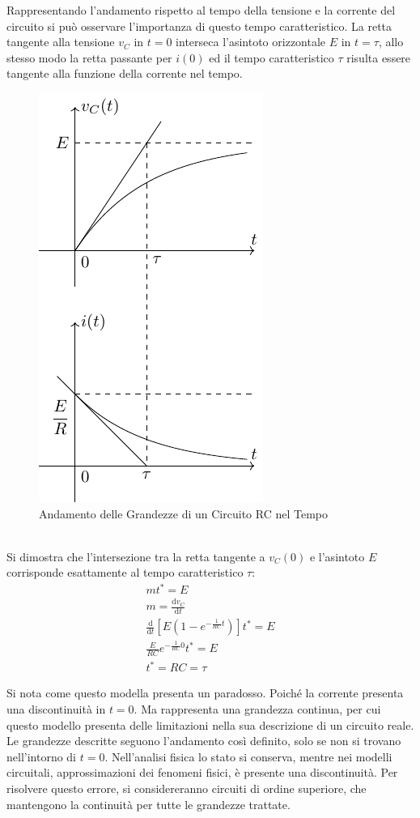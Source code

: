 \documentclass{article}
\newcommand{\df}{\mathrm{d}}
\numberwithin{equation}{subsection}
\begin{document}
Rappresentando l'andamento rispetto al tempo della tensione e la corrente del circuito si può osservare l'importanza di questo tempo caratteristico. La retta tangente alla tensione 
$v_C$ in $t=0$ interseca l'asintoto orizzontale $E$ in $t=\tau$, allo stesso modo la retta passante per $i(0)$ ed il tempo caratteristico $\tau$ risulta essere tangente alla 
funzione della corrente nel tempo. 
\begin{figure}[ht]%
    \centering
    \includegraphics{andamento-circuito-rc.pdf}
    \caption{Andamento delle Grandezze di un Circuito RC nel Tempo}
    \label{fig:andamento-rc}
\end{figure}
\\
Si dimostra che l'intersezione tra la retta tangente a $v_C(0)$ e l'asintoto $E$ corrisponde esattamente al tempo caratteristico $\tau$:
\begin{gather*}
    mt^*=E\\
    m=\displaystyle\frac{\df v_C}{\df t}\\
    \displaystyle\frac{\df}{\df t}\left[E\left(1-e^{-\frac{1}{RC}t}\right)\right]t^*=E\\
    \displaystyle\frac{E}{RC}e^{-\frac{1}{RC}0}t^*=E\\
    t^*=RC=\tau
\end{gather*}


Si nota come questo modella presenta un paradosso. Poiché la corrente presenta una discontinuità in $t=0$. Ma rappresenta una grandezza continua, per cui questo modello 
presenta delle limitazioni nella sua descrizione di un circuito reale. Le grandezze descritte seguono l'andamento così definito, solo se non si trovano nell'intorno di $t=0$. 
Nell'analisi fisica lo stato si conserva, mentre nei modelli circuitali, approssimazioni dei fenomeni fisici, è presente una discontinuità. Per risolvere questo errore, si 
considereranno circuiti di ordine superiore, che mantengono la continuità per tutte le grandezze trattate. 
\end{document}
